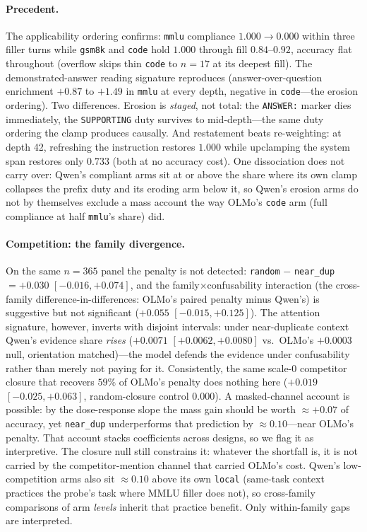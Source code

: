 \documentclass{article}
\begin{document}
\paragraph{Precedent.}
The applicability ordering confirms: \texttt{mmlu} compliance $1.000 \to 0.000$ within three
filler turns while \texttt{gsm8k} and \texttt{code} hold $1.000$ through fill $0.84$--$0.92$,
accuracy flat throughout (overflow skips thin \texttt{code} to $n{=}17$ at its deepest fill). The demonstrated-answer reading signature reproduces
(answer-over-question enrichment $+0.87$ to $+1.49$ in \texttt{mmlu} at every depth, negative
in \texttt{code}---the erosion ordering). Two differences. Erosion is \emph{staged}, not
total: the \texttt{ANSWER:} marker dies immediately, the \texttt{SUPPORTING} duty survives to
mid-depth---the same duty ordering the clamp produces causally. And restatement beats
re-weighting: at depth 42, refreshing the instruction restores $1.000$ while upclamping the
system span restores only $0.733$ (both at no accuracy cost). One dissociation does not carry
over: Qwen's compliant arms sit at or above the share where its own clamp collapses the prefix
duty and its eroding arm below it, so Qwen's erosion arms do not by themselves exclude a mass
account the way OLMo's \texttt{code} arm (full compliance at half \texttt{mmlu}'s share) did.

\paragraph{Competition: the family divergence.}
On the same $n{=}365$ panel the penalty is not detected: \texttt{random} $-$ \texttt{near\_dup}
$= +0.030$ $[-0.016,+0.074]$, and the family$\times$confusability interaction (the
cross-family difference-in-differences: OLMo's paired penalty minus Qwen's) is suggestive but
not significant ($+0.055$ $[-0.015,+0.125]$). The attention signature, however, inverts with
disjoint intervals: under near-duplicate context Qwen's evidence share \emph{rises}
($+0.0071$ $[+0.0062,+0.0080]$ vs.\ OLMo's $+0.0003$ null, orientation matched)---the model
defends the evidence
under confusability rather than merely not paying for it. Consistently, the same scale-$0$
competitor closure that recovers $59\%$ of OLMo's penalty does nothing here ($+0.019$
$[-0.025,+0.063]$, random-closure control $0.000$). A masked-channel account is possible: by
the dose-response slope the mass gain should be worth ${\approx}+0.07$ of accuracy, yet
\texttt{near\_dup} underperforms that prediction by ${\approx}0.10$---near OLMo's penalty.
That account stacks coefficients across designs, so we flag it as interpretive. The closure
null still constrains it: whatever the shortfall is, it is not carried by the
competitor-mention channel that carried OLMo's cost. Qwen's
low-competition arms also sit ${\approx}0.10$ above its own \texttt{local}
(same-task context practices the probe's task where MMLU filler does not), so cross-family
comparisons of arm \emph{levels} inherit that practice benefit. Only within-family gaps are
interpreted.
\end{document}
